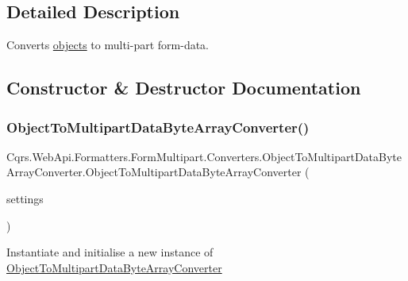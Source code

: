 \subsection{Detailed Description}
Converts \hyperlink{}{objects} to multi-\/part form-\/data. 



\subsection{Constructor \& Destructor Documentation}
\mbox{\label{classCqrs_1_1WebApi_1_1Formatters_1_1FormMultipart_1_1Converters_1_1ObjectToMultipartDataByteArrayConverter_a1e647950d2959aa53e54a17ba86df058_a1e647950d2959aa53e54a17ba86df058}} 
\subsubsection{\texorpdfstring{Object\+To\+Multipart\+Data\+Byte\+Array\+Converter()}{ObjectToMultipartDataByteArrayConverter()}}
{\footnotesize\ttfamily Cqrs.\+Web\+Api.\+Formatters.\+Form\+Multipart.\+Converters.\+Object\+To\+Multipart\+Data\+Byte\+Array\+Converter.\+Object\+To\+Multipart\+Data\+Byte\+Array\+Converter (\begin{DoxyParamCaption}\item[{\hyperlink{classCqrs_1_1WebApi_1_1Formatters_1_1FormMultipart_1_1Infrastructure_1_1MultipartFormatterSettings}{Multipart\+Formatter\+Settings}}]{settings }\end{DoxyParamCaption})}



Instantiate and initialise a new instance of \hyperlink{classCqrs_1_1WebApi_1_1Formatters_1_1FormMultipart_1_1Converters_1_1ObjectToMultipartDataByteArrayConverter}{Object\+To\+Multipart\+Data\+Byte\+Array\+Converter} 


